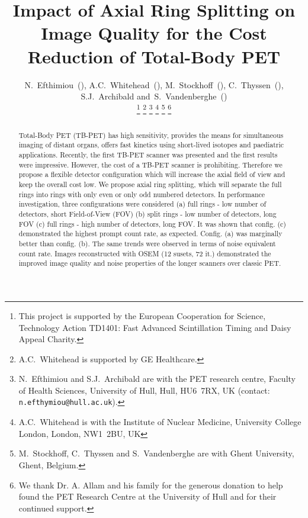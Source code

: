 \documentclass{IEEEtran}
\begin{document}
\title{Impact of Axial Ring Splitting on Image Quality for the Cost Reduction of Total-Body PET}

\author{N.~Efthimiou~(),
        A.C.~Whitehead~(),
        M.~Stockhoff~(), 
        C.~Thyssen~(),
        S.J.~Archibald
        and~S.~Vandenberghe~()%
        
        \vspace{-0.5cm}
        
        \thanks{This project is supported by the European Cooperation for Science, Technology Action TD1401: Fast Advanced Scintillation Timing and Daisy Appeal Charity.}%
        \thanks{A.C.~Whitehead is supported by GE Healthcare.}%
        \thanks{N.~Efthimiou and S.J.~Archibald are with the PET research centre, Faculty of Health Sciences, University of Hull, Hull, HU6~7RX, UK (contact: \texttt{n.efthymiou@hull.ac.uk}).}%
        \thanks{A.C.~Whitehead is with the Institute of Nuclear Medicine, University College London, London, NW1~2BU, UK}%
        \thanks{M.~Stockhoff, C.~Thyssen  and S.~Vandenberghe are with Ghent University, Ghent, Belgium.}%
        \thanks{We thank Dr. A. Allam and his family for the generous donation to help found the PET Research Centre at the University of Hull and for their continued support.}}%

\maketitle
\vspace{-1cm}
    
\IEEEpeerreviewmaketitle
\vspace{-1cm}

\begin{abstract}
Total-Body PET (TB-PET) has high sensitivity, provides the means for simultaneous imaging of distant organs, offers fast kinetics using short-lived isotopes and paediatric applications. Recently, the first TB-PET scanner was presented and the first results were impressive. However, the cost of a TB-PET scanner is prohibiting. Therefore we propose a flexible detector configuration which will increase the axial field of view and keep the overall cost low. We propose axial ring splitting, which will separate the full rings into rings with only even or only odd numbered detectors. In performance investigation, three configurations were considered (a) full rings - low number of detectors, short Field-of-View (FOV) (b) split rings - low number of detectors, long FOV (c) full rings - high number of detectors, long FOV. It was shown that config. (c) demonstrated the highest prompt count rate, as expected. Config. (a) was marginally better than config. (b). The same trends were observed in terms of noise equivalent count rate. Images reconstructed with OSEM (12 susets, 72 it.) demonstrated the improved image quality and noise properties of the longer scanners over classic PET.
\end{abstract}
\end{document}
